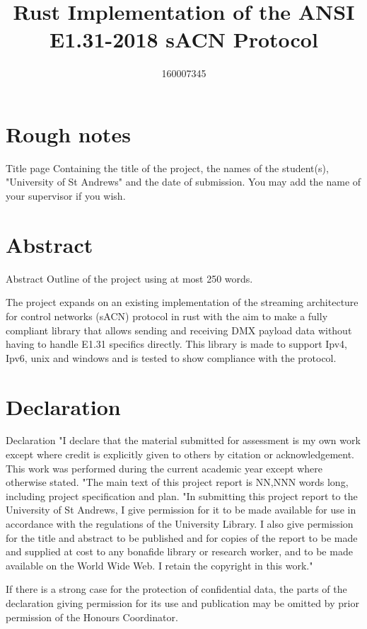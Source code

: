 \documentclass[11pt,a4paper,notitlepage]{report}
\author{160007345}
\title{Rust Implementation of the ANSI E1.31-2018 sACN Protocol}
\begin{document}
	\maketitle
	\section{Rough notes}
	Title page
	Containing the title of the project, the names of the
	student(s), "University of St Andrews" and the date of
	submission. You may add the name of your supervisor
	if you wish.
	
	\section{Abstract}
	Abstract Outline of the project using at most 250 words.
	
	The project expands on an existing implementation \cite{ORIGNIAL_IMPL} of the streaming architecture for control networks (sACN) protocol \cite{ANSI_E1.31} in rust with the aim to make a fully compliant library that allows sending and receiving DMX payload data without having to handle E1.31 specifics directly. This library is made to support Ipv4, Ipv6, unix and windows and is tested to show compliance with the protocol.
	
	\section{Declaration}
	Declaration
	"I declare that the material submitted for
	assessment is my own work except where credit is
	explicitly given to others by citation or
	acknowledgement. This work was performed during
	the current academic year except where otherwise
	stated.
	"The main text of this project report is NN,NNN
	words long, including project specification and plan.
	"In submitting this project report to the University of
	St Andrews, I give permission for it to be made
	available for use in accordance with the regulations of the University Library. I also give permission for
	the title and abstract to be published and for copies of the report to be made and supplied at cost to any bonafide library or research worker, and to be made
	available on the World Wide Web. I retain the
	copyright in this work."
	
	If there is a strong case for the protection of
	confidential data, the parts of the declaration giving
	permission for its use and publication may be omitted
	by prior permission of the Honours Coordinator.
	
\end{document}
